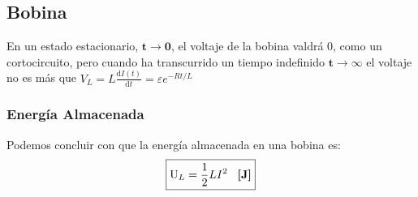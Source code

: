 \subsection{Bobina}
\begin{wrapfigure}{r}{2cm}
\end{wrapfigure}
 En un estado estacionario, \(\mathbf{t \rightarrow 0}\), el voltaje de la bobina valdrá 0, como un cortocircuito, pero cuando ha transcurrido un tiempo indefinido \(\mathbf{t \rightarrow \infty}\) el voltaje no es más que \(V_L = L \frac{\mathrm{d}I(t)}{\mathrm{d}t} = \varepsilon e^{-Rt/L}\)
\subsubsection{Energía Almacenada}
 Podemos concluir con que la energía almacenada en una bobina es:
\[
        \boxed{\mathrm{U}_L = \frac{1}{2}LI^2 \hspace{3mm} \textnormal{\textbf{[J]}}}
\]